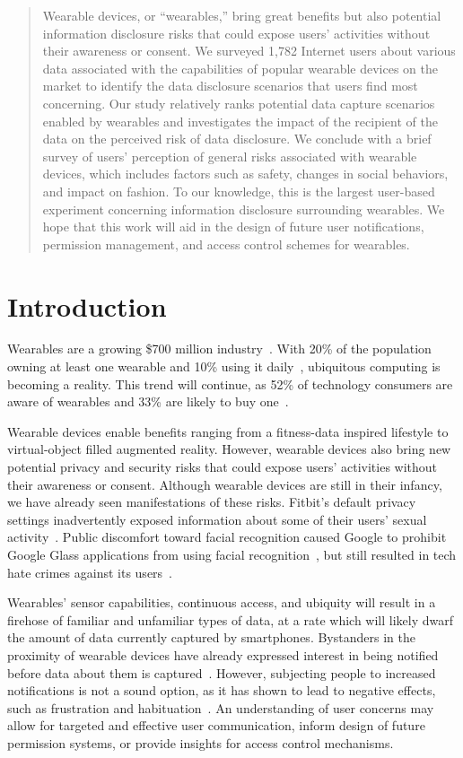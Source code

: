 \documentclass[conference]{IEEEtran}
\begin{document}
\begin{abstract}
\noindent Wearable devices, or ``wearables,'' bring great benefits but also potential information disclosure risks that could expose users' activities without their awareness or consent. We surveyed 1,782 Internet users about various data associated with the capabilities of popular wearable devices on the market to identify the data disclosure scenarios that users find most concerning. Our study relatively ranks potential data capture scenarios enabled by wearables and investigates the impact of the recipient of the data on the perceived risk of data disclosure. We conclude with a brief survey of users' perception of general risks associated with wearable devices, which includes factors such as safety, changes in social behaviors, and impact on fashion. To our knowledge, this is the largest user-based experiment concerning information disclosure surrounding wearables. We hope that this work will aid in the design of future user notifications, permission management, and access control schemes for wearables.
\end{abstract}

\section{Introduction}

Wearables are a growing \$700 million industry~\cite{cmo}. With 20\% of the population owning at least one wearable and 10\% using it daily~\cite{WearableStatNews}, ubiquitous computing is becoming a reality. This trend will continue, as 52\% of technology consumers are aware of wearables and 33\% are likely to buy one~\cite{NPD}.  

Wearable devices enable benefits ranging from a fitness-data inspired lifestyle to virtual-object filled augmented reality. However, wearable devices also bring new potential privacy and security risks that could expose users' activities without their awareness or consent. Although wearable devices are still in their infancy, we have already seen manifestations of these risks. Fitbit's default privacy settings inadvertently exposed information about some of their users' sexual activity~\cite{Fitbit}. Public discomfort toward facial recognition caused Google to prohibit Google Glass applications from using facial recognition~\cite{GlassDetection}, but still resulted in tech hate crimes against its users~\cite{1_russell_2014,16_gross_2014}. 

Wearables' sensor capabilities, continuous access, and ubiquity will result in a firehose of familiar and unfamiliar types of data, at a rate which will likely dwarf the amount of data currently captured by smartphones. Bystanders in the proximity of wearable devices have already expressed interest in being notified before data about them is captured~\cite{denning2014situ}. However, subjecting people to increased notifications is not a sound option, as it has shown to lead to negative effects, such as frustration and habituation~\cite{bohme2011security}. An understanding of user concerns may allow for targeted and effective user communication, inform design of future permission systems, or provide insights for access control mechanisms. 
\end{document}

